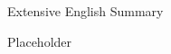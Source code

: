 \pagestyle{plain}
\begin{center}
{\LARGE Extensive English Summary}\\[1cm]
\end{center}

\setlength{\parindent}{24pt} Placeholder

